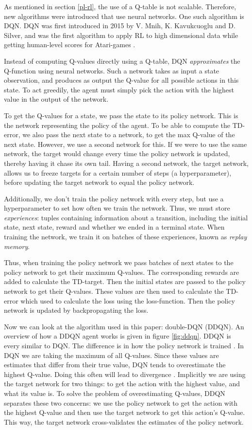 As mentioned in section \ref{pl-rl}, the use of a Q-table is not scalable. Therefore, new algorithms were introduced that use neural networks. One such algorithm is DQN. DQN was first introduced in 2015 by V. Mnih, K. Kavukcuoglu and D. Silver, and was the first algorithm to apply RL to high dimensional data while getting human-level scores for Atari-games \cite{dqn}.

Instead of computing Q-values directly using a Q-table, DQN \emph{approximates} the Q-function using neural networks. Such a network takes as input a state observation, and produces as output the Q-value for all possible actions in this state. To act greedily, the agent must simply pick the action with the highest value in the output of the network.

To get the Q-values for a state, we pass the state to its policy network. This is the network representing the policy of the agent. To be able to compute the TD-error, we also pass the next state to a network, to get the max Q-value of the next state. However, we use a second network for this. If we were to use the same network, the target would change every time the policy network is updated, thereby having it chase its own tail. Having a second network, the target network, allows us to freeze targets for a certain number of steps (a hyperparameter), before updating the target network to equal the policy network.

Additionally, we don't train the policy network with every step, but use a hyperparameter to set how often we train the network. Thus, we must store \emph{experiences}: tuples containing information about a transition, including the initial state, next state, reward and whether we ended in a terminal state. When training the network, we train it on batches of these experiences, known as \emph{replay memory}. 

Thus, when training the policy network we pass batches of next states to the policy network to get their maximum Q-values. The corresponding rewards are added to calculate the TD-target. Then the initial states are passed to the policy network to get their Q-values. These values are then used to calculate the TD-error which used to calculate the loss using the loss-function. Then the policy network is updated by backpropagating the loss.

Now we can look at the algorithm used in this paper: double-DQN (DDQN). An overview of how a DDQN agent works is given in figure \ref{fig:ddqn}. DDQN is every similar to DQN. The difference is in how the policy network is trained \cite{ddqn}. In DQN we are taking the maximum of all Q-values. Since these values are estimates that differ from their true value, DQN tends to overestimate the highest Q-value. Doing this often will lead to divergence \cite[p. 293-297]{grokking}. Implicitly we are using the target network for two things: to get the action with the highest value, and what its value is. To solve the problem of overestimating Q-values, DDQN separates these two concerns: we use the policy network to get the action with the highest Q-value and then use the target network to get this action's Q-value. This way, the target network cross-validates the estimates of the policy network.

